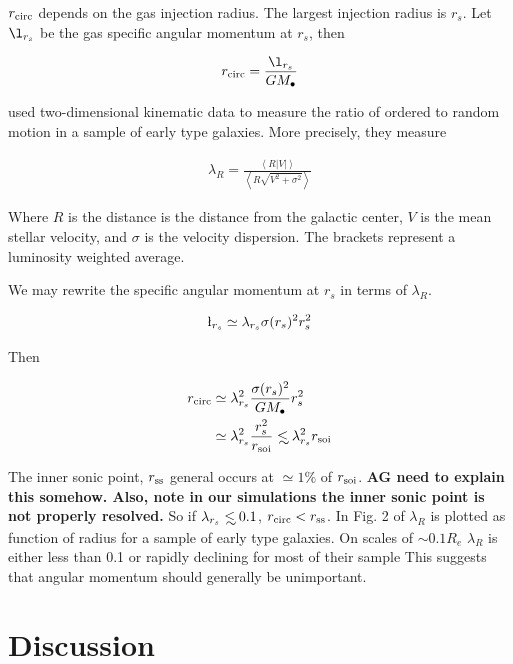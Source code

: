 \documentclass[usenatbib,fleqn]{mn2e}
\newcommand\lsim{\mathrel{\rlap{\lower4pt\hbox{\hskip1pt$\sim$}}
    \raise1pt\hbox{$<$}}}
\newcommand{\rs}{r_s}
\newcommand{\rcirc}{r_{\rm circ}}
\newcommand{\rss}{r_{\rm ss}}
\newcommand{\lrs}{\l_{\rs}}
\newcommand{\lambdars}{\lambda_{\rs}}
\newcommand{\Mbh}[1][]{M_{\bullet#1}}
\newcommand{\soi}{\rm soi}
\newcommand{\rsoi}{r_{\soi}}
\begin{document}
  $\rcirc$ depends on the gas injection radius. The largest
  injection radius is $\rs$. Let $\lrs$ be the gas specific angular
  momentum at $\rs$, then 

  \begin{align}
    \rcirc=\frac{\lrs}{G \Mbh}
  \end{align}

  \citet{EmsellemCappellari+:2007a} used two-dimensional kinematic
  data to measure the ratio of ordered to random motion in a sample of
  early type galaxies. More precisely, they measure

  \begin{align}
    \lambda_R=\frac{\left<R|V|\right>}{\left<R\sqrt{V^2+\sigma^2}\right>}
  \end{align}

  Where $R$ is the distance is the distance from the galactic center, $V$ is
  the mean stellar velocity, and $\sigma$ is the velocity
  dispersion. The brackets represent a luminosity weighted average.

  We may rewrite the specific angular momentum at $\rs$ in terms of
  $\lambda_R$.

  \begin{align}
    \lrs\simeq\lambdars \sigma(\rs)^2 \rs^2
  \end{align}

  Then

  \begin{align}
    \rcirc&\simeq\lambdars^2 \frac{\sigma(\rs)^2}{G \Mbh} \rs^2\\
    &\simeq\lambdars^2 \frac{\rs^2}{\rsoi} \lsim \lambdars^2 \rsoi
  \end{align}

  The inner sonic point, $\rss$ general occurs at $\simeq 1\%$ of
  $\rsoi$. {\bf AG need to explain this somehow. Also, note in our
    simulations the inner sonic point is not properly resolved.}
  So if $\lambdars\lsim 0.1$, $\rcirc<\rss$. In Fig. 2 of
  \citet{EmsellemCappellari+:2007a} $\lambda_R$ is plotted as function
  of radius for a sample of early type galaxies. On scales of $\sim 0.1
  R_e$ $\lambda_R$ is either less than 0.1 or rapidly declining for most
  of their sample %
  This suggests that angular momentum should generally be unimportant.

\section{Discussion}
\end{document}
